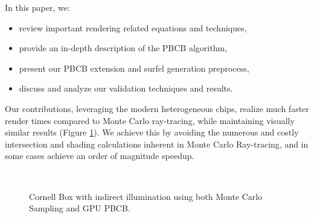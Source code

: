 \noindent In this paper, we:
\begin{itemize}
\item review important rendering related equations and techniques,
\item provide an in-depth description of the PBCB algorithm,
\item present our PBCB extension and surfel generation preprocess,
\item discuss and analyze our validation techniques and results.
\end{itemize}

Our contributions, leveraging the modern heterogeneous chips, realize much faster render times compared to Monte Carlo ray-tracing, while maintaining visually similar results (Figure \ref{fig:compare_techniques}). We achieve this by avoiding the numerous and costly intersection and shading calculations inherent in Monte Carlo Ray-tracing, and in some cases achieve an order of magnitude speedup.

\begin{figure}[h!]
    \centering
    ~
    \caption[Cornell Box comparison]{Cornell Box with indirect illumination using both Monte Carlo Sampling and GPU PBCB.}
    \label{fig:compare_techniques}
\end{figure}

